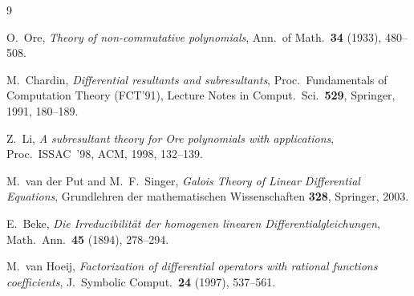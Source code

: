 \documentclass[11pt]{article}
\begin{document}
\begin{thebibliography}{9}

 O.~Ore,
\emph{Theory of non-commutative polynomials},
Ann.\ of Math.\ \textbf{34} (1933), 480--508.

 M.~Chardin,
\emph{Differential resultants and subresultants},
Proc.\ Fundamentals of Computation Theory (FCT'91),
Lecture Notes in Comput.\ Sci.\ \textbf{529}, Springer, 1991, 180--189.

 Z.~Li,
\emph{A subresultant theory for Ore polynomials with applications},
Proc.\ ISSAC~'98, ACM, 1998, 132--139.

 M.~van der Put and M.~F.~Singer,
\emph{Galois Theory of Linear Differential Equations},
Grundlehren der mathematischen Wissenschaften \textbf{328},
Springer, 2003.

 E.~Beke,
\emph{Die Irreducibilit\"at der homogenen linearen Differentialgleichungen},
Math.\ Ann.\ \textbf{45} (1894), 278--294.

 M.~van Hoeij,
\emph{Factorization of differential operators with rational functions
coefficients},
J.\ Symbolic Comput.\ \textbf{24} (1997), 537--561.

\end{thebibliography}
\end{document}
